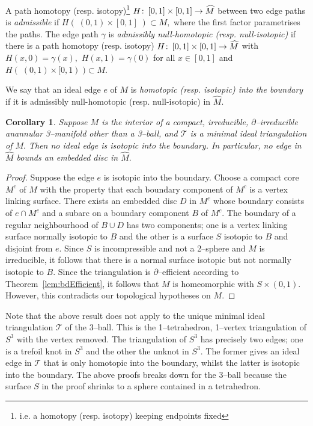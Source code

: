 \documentclass[a4paper]{gtart}
\def\tri{\mathcal{T}}
\def\manifold{M}
\def\core{M^c}
\theoremstyle{plain}
\newtheorem{corollary}[theorem]{Corollary}
\theoremstyle{definition}
\theoremstyle{remark}
\numberwithin{equation}{section}
\begin{document}
A path homotopy (resp. isotopy)\footnote{i.e. a homotopy (resp. isotopy) keeping endpoints fixed}
 $H\co [0,1] \times [0,1]\to \widehat{\manifold}$ between two edge paths is \emph{admissible} if $H(\; (0,1)\times [0,1]\;) \subset \manifold,$ where the first factor parametrises the paths. The edge path $\gamma$ is \emph{admissibly null-homotopic (resp. null-isotopic)} if there is a path homotopy (resp. isotopy) $H\co [0,1] \times [0,1]\to \widehat{\manifold}$ with $H(x, 0) = \gamma(x),$ $H(x, 1) = \gamma(0)$ for all $x\in [0,1]$ and $H(\; (0,1)\times [0,1)\;) \subset \manifold.$

We say that an ideal edge $e$ of $\manifold$ is \emph{homotopic (resp. isotopic) into the boundary} if it is admissibly null-homotopic (resp. null-isotopic) in $\widehat{\manifold}.$

\begin{corollary}\label{cor-min-bddry-eff}
Suppose $\manifold$ is the interior of a compact, irreducible, $\partial$--irreducible anannular 3--manifold other than a 3--ball, and $\tri$ is a minimal ideal triangulation of $\manifold .$ Then no ideal edge is isotopic into the boundary. In particular, no edge in $\widehat{\manifold}$ bounds an embedded disc in $\widehat{\manifold}.$
\end{corollary}

\begin{proof}
Suppose the edge $e$ is isotopic into the boundary. Choose a compact core $\core$ of $\manifold$ with the property that each boundary component of $\core$ is a vertex linking surface. 
There exists an embedded disc $D$ in $\core$ whose boundary consists of $e \cap \core$ and a subarc on a boundary component $B$ of $\core.$ The boundary of a regular neighbourhood of $B\cup D$ has two components; one is a vertex linking surface normally isotopic to $B$ and the other is a surface $S$ isotopic to $B$ and disjoint from $e.$ Since $S$ is incompressible and not a 2--sphere and $\manifold$ is irreducible, it follows that there is a normal surface isotopic but not normally isotopic to $B.$ Since the triangulation is $\partial$--efficient according to Theorem~\ref{lem:bdEfficient}, it follows that $\manifold$ is homeomorphic with $S \times (0,1).$ However, this contradicts our topological hypotheses on $\manifold .$
\end{proof}

Note that the above result does not apply to the unique minimal ideal triangulation $\tri$ of the 3--ball. This is the 1--tetrahedron, 1--vertex triangulation of $S^3$ with the vertex removed. The triangulation of $S^3$ has precisely two edges; one is a trefoil knot in $S^3$ and the other the unknot in $S^3.$ The former gives an ideal edge in $\tri$ that is only homotopic into the boundary, whilst the latter is isotopic into the boundary. The above proofs breaks down for the 3--ball because the surface $S$ in the proof shrinks to a sphere contained in a tetrahedron.
\end{document}
